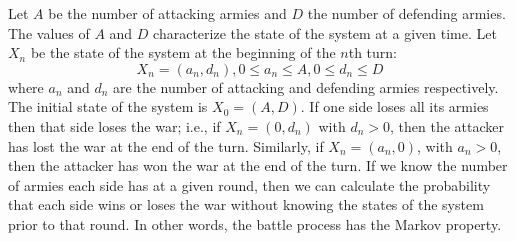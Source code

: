 \documentclass[12pt]{article}
\begin{document}
Let \( A \) be the number of attacking armies and \( D \) the number of
defending armies.  The values of \( A \) and \( D \) characterize the
state of the system at a given time.  Let \( X_n \) be the state of the
system at the beginning of the \( n \)th turn:
\[
    X_n = (a_n, d_n), 0 \le a_n \le A, 0 \le d_n \le D
\] where \( a_n \) and \( d_n \) are the number of attacking and
defending armies respectively.  The initial state of the system is \( X_0
= (A, D) \).  If one side loses all its armies then that side loses the
war; i.e., if \( X_n= (0, d_n) \) with \( d_n > 0 \), then the attacker
has lost the war at the end of the turn.  Similarly, if \( X_n= (a_n ,0)
\), with \( a_n > 0 \), then the attacker has won the war at the end of
the turn.  If we know the number of armies each side has at a given
round, then we can calculate the probability that each side wins or
loses the war without knowing the states of the system prior to that
round.  In other words, the battle process has the Markov property.
\end{document}
